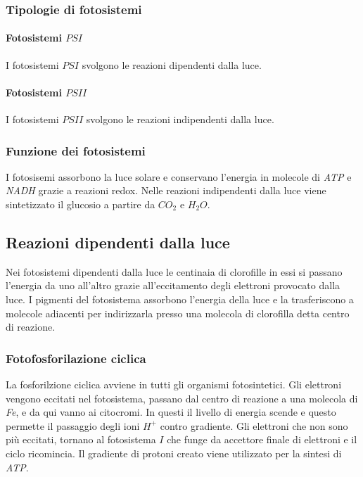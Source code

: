 		\subsubsection{Tipologie di fotosistemi}

			\paragraph{Fotosistemi \emph{$PSI$}}
			I fotosistemi \emph{$PSI$} svolgono le reazioni dipendenti dalla luce.

			\paragraph{Fotosistemi \emph{$PSII$}}
			I fotosistemi \emph{$PSII$} svolgono le reazioni indipendenti dalla luce.

		\subsubsection{Funzione dei fotosistemi}
		I fotosisemi assorbono la luce solare e conservano l'energia in molecole di \emph{ATP} e \emph{NADH} grazie a reazioni redox.
		Nelle reazioni indipendenti dalla luce viene sintetizzato il glucosio a partire da \emph{$CO_2$} e \emph{$H_2O$}.

	\subsection{Reazioni dipendenti dalla luce}
	Nei fotosistemi dipendenti dalla luce le centinaia di clorofille in essi si passano l'energia da uno all'altro grazie all'eccitamento degli elettroni provocato dalla luce. 
	I pigmenti del fotosistema assorbono l'energia della luce e la trasferiscono a molecole adiacenti per indirizzarla presso una molecola di clorofilla detta centro di reazione. 

		\subsubsection{Fotofosforilazione ciclica}
		La fosforilzione ciclica avviene in tutti gli organismi fotosintetici. 
		Gli elettroni vengono eccitati nel fotosistema, passano dal centro di reazione a una molecola di \emph{Fe}, e da qui vanno ai citocromi. 
		In questi il livello di energia scende e questo permette il passaggio degli ioni \emph{$H^+$} contro gradiente. 
		Gli elettroni che non sono pi\`u eccitati, tornano al fotosistema $I$ che funge da accettore finale di elettroni e il ciclo ricomincia. 
		Il gradiente di protoni creato viene utilizzato per la sintesi di \emph{ATP}.

